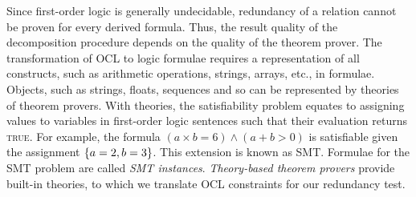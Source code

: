 Since first-order logic is generally undecidable, redundancy of a relation cannot be proven for every derived formula.
Thus, the result quality of the decomposition procedure depends on the quality of the theorem prover.
The transformation of \gls{OCL} to logic formulae requires a representation of all constructs, such as arithmetic operations, strings, arrays, etc., in formulae.
Objects, such as strings, floats, sequences and so can be represented by theories of theorem provers.
With theories, the satisfiability problem equates to assigning values to variables in first-order logic sentences such that their evaluation returns \textsc{true}.
For example, the formula $(a \times b = 6) \land (a + b > 0)$ is satisfiable given the assignment $\{ a = 2, b = 3 \}$.
This extension is known as \gls{SMT}.
Formulae for the \gls{SMT} problem are called \emph{\gls{SMT} instances}.
\emph{Theory-based theorem provers} provide built-in theories, to which we translate \gls{OCL} constraints for our redundancy test.


